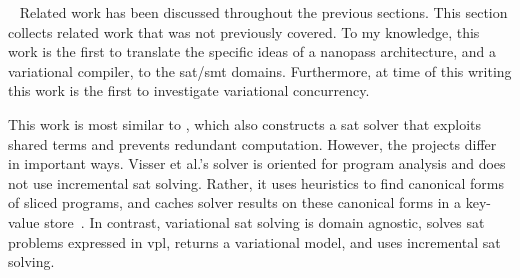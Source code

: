 ~\label{sec:related-work}
Related work has been discussed throughout the previous sections. This section
collects related work that was not previously covered. To my knowledge, this
work is the first to translate the specific ideas of a nanopass architecture,
and a variational compiler, to the \ac{sat}/\ac{smt} domains. Furthermore, at
time of this writing this work is the first to investigate variational
concurrency.


%
This work is most similar to \cite{Visser:2012:GRR:2393596.2393665}, which also
constructs a \ac{sat} solver that exploits shared terms and prevents redundant
computation. However, the projects differ in important ways. Visser et al.'s
solver is oriented for program analysis and does not use incremental \ac{sat}
solving. Rather, it uses heuristics to find canonical forms of sliced programs,
and caches solver results on these canonical forms in a key-value
store~\cite{redis}. In contrast, variational \ac{sat} solving is domain
agnostic, solves \ac{sat} problems expressed in \ac{vpl}, returns a variational
model, and uses incremental \ac{sat} solving.


